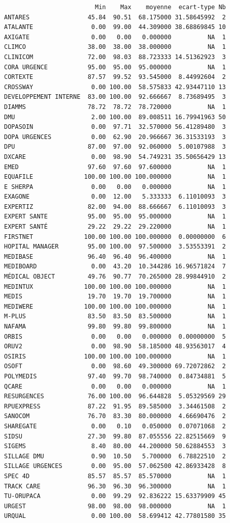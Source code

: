 \documentclass[]{article}
\begin{document}
\begin{verbatim}
                         Min    Max    moyenne  ecart-type Nb
ANTARES                45.84  90.51  68.175000 31.58645992  2
ATALANTE                0.00  99.00  44.309000 38.68869845 10
AXIGATE                 0.00   0.00   0.000000          NA  1
CLIMCO                 38.00  38.00  38.000000          NA  1
CLINICOM               72.00  98.03  88.723333 14.51362923  3
CORA URGENCE           95.00  95.00  95.000000          NA  1
CORTEXTE               87.57  99.52  93.545000  8.44992604  2
CROSSWAY                0.00 100.00  58.575833 42.93447110 13
DEVELOPPEMENT INTERNE  83.00 100.00  92.666667  8.73689495  3
DIAMMS                 78.72  78.72  78.720000          NA  1
DMU                     2.00 100.00  89.008511 16.79941963 50
DOPASOIN                0.00  97.71  32.570000 56.41289480  3
DOPA URGENCES           0.00  62.90  20.966667 36.31533193  3
DPU                    87.00  97.00  92.060000  5.00107988  3
DXCARE                  0.00  98.90  54.749231 35.50656429 13
EMED                   97.60  97.60  97.600000          NA  1
EQUAFILE              100.00 100.00 100.000000          NA  1
E SHERPA                0.00   0.00   0.000000          NA  1
EXAGONE                 0.00  12.00   5.333333  6.11010093  3
EXPERTIZ               82.00  94.00  88.666667  6.11010093  3
EXPERT SANTE           95.00  95.00  95.000000          NA  1
EXPERT SANTÉ           29.22  29.22  29.220000          NA  1
FIRSTNET              100.00 100.00 100.000000  0.00000000  6
HOPITAL MANAGER        95.00 100.00  97.500000  3.53553391  2
MEDIBASE               96.40  96.40  96.400000          NA  1
MEDIBOARD               0.00  43.20  10.344286 16.96571824  7
MÉDICAL OBJECT         49.76  90.77  70.265000 28.99844910  2
MEDINTUX              100.00 100.00 100.000000          NA  1
MEDIS                  19.70  19.70  19.700000          NA  1
MEDIWERE              100.00 100.00 100.000000          NA  1
M-PLUS                 83.50  83.50  83.500000          NA  1
NAFAMA                 99.80  99.80  99.800000          NA  1
ORBIS                   0.00   0.00   0.000000  0.00000000  5
ORUV2                   0.00  98.90  58.185000 48.93563017  4
OSIRIS                100.00 100.00 100.000000          NA  1
OSOFT                   0.00  98.60  49.300000 69.72072862  2
POLYMEDIS              97.40  99.70  98.740000  0.84734881  5
QCARE                   0.00   0.00   0.000000          NA  1
RESURGENCES            76.00 100.00  96.644828  5.05329569 29
RPUEXPRESS             87.22  91.95  89.585000  3.34461508  2
SANOCOM                76.70  83.30  80.000000  4.66690476  2
SHAREGATE               0.00   0.10   0.050000  0.07071068  2
SIDSU                  27.30  99.80  87.055556 22.82515669  9
SIGEMS                  8.40  80.00  44.200000 50.62884553  3
SILLAGE DMU             0.90  10.50   5.700000  6.78822510  2
SILLAGE URGENCES        0.00  95.00  57.062500 42.86933428  8
SPEC 4D                85.57  85.57  85.570000          NA  1
TRACK CARE             96.30  96.30  96.300000          NA  1
TU-ORUPACA              0.00  99.29  92.836222 15.63379909 45
URGEST                 98.00  98.00  98.000000          NA  1
URQUAL                  0.00 100.00  58.699412 42.77801580 35
\end{verbatim}
\end{document}
